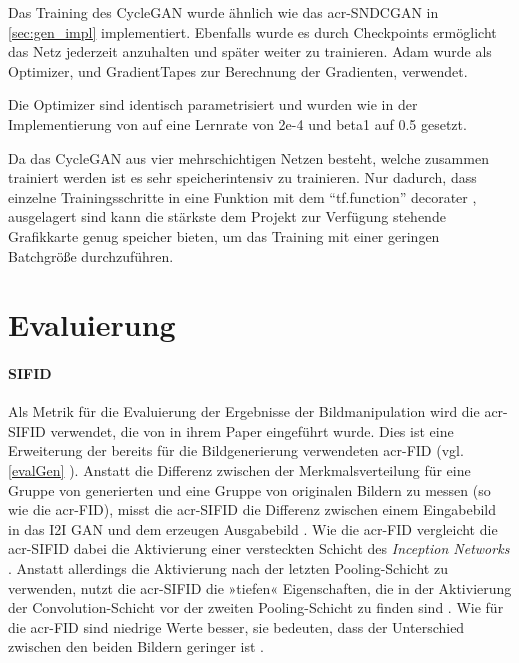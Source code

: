  Das Training des CycleGAN wurde ähnlich wie das \gls{acr-SNDCGAN} in \cref{sec:gen_impl} implementiert. Ebenfalls wurde es durch Checkpoints ermöglicht das Netz jederzeit anzuhalten und später weiter zu trainieren. Adam \cite{tf:adam} wurde als Optimizer, und GradientTapes \cite{tf:gradientape} zur Berechnung der Gradienten, verwendet.
 
Die Optimizer sind identisch parametrisiert und wurden wie in der Implementierung von \cite{brownlee_how_2019-1} auf eine Lernrate von 2e-4 und beta1 auf 0.5 gesetzt. 

Da das CycleGAN aus vier mehrschichtigen Netzen besteht, welche zusammen trainiert werden ist es sehr speicherintensiv zu trainieren. Nur dadurch, dass einzelne Trainingsschritte in eine Funktion mit dem \enquote{tf.function} decorater \cite{noauthor_tffunction_nodate}, ausgelagert sind kann die stärkste dem Projekt zur Verfügung stehende Grafikkarte genug speicher bieten, um das Training mit einer geringen Batchgröße durchzuführen. 


 \section{Evaluierung} %

 \paragraph{SIFID} Als Metrik für die Evaluierung der Ergebnisse der
 Bildmanipulation wird die \gls{acr-SIFID} verwendet, die von
 \citeauthor{shaham2019singan} in ihrem Paper 
 \cite{shaham2019singan} eingeführt wurde. Dies ist eine Erweiterung der bereits
 für die Bildgenerierung verwendeten \gls{acr-FID} \cite{heusel2017gans} (vgl.
 \cref{evalGen} %
 ). Anstatt die Differenz zwischen der Merkmalsverteilung für eine
 Gruppe von generierten und eine Gruppe von originalen Bildern zu messen (so wie
 die \gls{acr-FID}), misst die \gls{acr-SIFID} die Differenz zwischen einem
 Eingabebild in das I2I GAN und dem erzeugen Ausgabebild
 \cite[S. 4575]{shaham2019singan}. Wie die \gls{acr-FID} vergleicht die
 \gls{acr-SIFID} dabei die Aktivierung einer versteckten Schicht des
 \emph{Inception Networks} \cite{szegedy2015going}.
 Anstatt allerdings die
 Aktivierung nach der letzten Pooling-Schicht zu verwenden, nutzt die
 \gls{acr-SIFID} die »tiefen« Eigenschaften, die in der Aktivierung der
 Convolution-Schicht vor der zweiten Pooling-Schicht zu finden sind \cite[S.
 4575]{shaham2019singan}. Wie für die \gls{acr-FID} sind niedrige Werte besser,
 sie bedeuten, dass der Unterschied zwischen den beiden Bildern geringer ist
 \cite[S. 5]{pang2021image}.